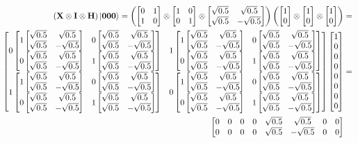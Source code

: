 \newpage
\noindent
\begin{figure}[H]
    \centering
    \begin{align*}
        \left(\qtx\otimes\qti\otimes\qth\right)\ket{\qtz\qtz\qtz}=\left(\qx\otimes\qi\otimes\qh\right)\left(\qz\otimes\qz\otimes\qz\right)&= \\
        \begin{bmatrix}
            0
            \begin{bmatrix}
                1 \qh & 0 \qh\\
                0 \qh & 1 \qh\\
            \end{bmatrix}
            & 1
            \begin{bmatrix}
                1 \qh & 0 \qh\\
                0 \qh & 1 \qh\\
            \end{bmatrix}\\
            1 
            \begin{bmatrix}
                1 \qh & 0 \qh\\
                0 \qh & 1 \qh\\
            \end{bmatrix}
            & 0
            \begin{bmatrix}
                1 \qh & 0 \qh\\
                0 \qh & 1 \qh\\
            \end{bmatrix}\\ 
        \end{bmatrix}
        \begin{bmatrix}
            1\\
            0\\
            0\\
            0\\
            0\\
            0\\
            0\\
            0
        \end{bmatrix}
        &=\\
        \begin{bmatrix}
        0           &  0          &   0          &   0          &   \sqrt{0.5}      &          \sqrt{0.5} &   0          &   0         \\
        0           &  0          &   0          &   0          &   \sqrt{0.5}      &         -\sqrt{0.5} &   0          &   0         \\

\end{bmatrix}
\end{align*}
\end{figure}
